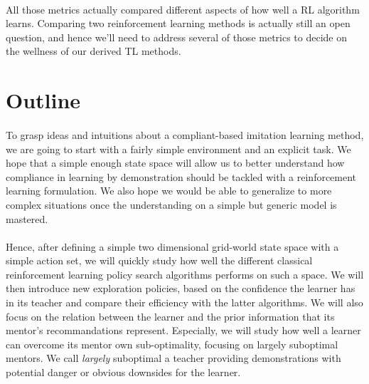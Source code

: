 \documentclass[a4paper]{report}
\begin{document}
{{{				\paragraph{} All those metrics actually compared different aspects of how well a RL algorithm learns. Comparing two reinforcement learning methods is actually still an open question, and hence we'll need to address several of those metrics to decide on the wellness of our derived TL methods. 
			}
		}
		\section{Outline}
		{
			
			\paragraph{} To grasp ideas and intuitions about a compliant-based imitation learning method, we are going to start with a fairly simple environment and an explicit task. We hope that a simple enough state space will allow us to better understand how compliance in learning by demonstration should be tackled with a reinforcement learning formulation.  We also hope we would be able to generalize to more complex situations once the understanding on a simple but generic model is mastered. 
			
			\paragraph{} Hence, after defining a simple two dimensional grid-world state space with a simple action set, we will quickly study how well the different classical reinforcement learning policy search algorithms performs on such a space. We will then introduce new exploration policies, based on the confidence the learner has in its teacher and compare their efficiency with the latter algorithms. We will also focus on the relation between the learner and the prior information that its mentor's recommandations represent. Especially, we will study how well a learner can overcome its mentor own sub-optimality, focusing on largely suboptimal mentors. We call \emph{largely} suboptimal a teacher providing demonstrations with potential danger or obvious downsides for the learner. 
		}
	}
	\newpage
	
\end{document}

